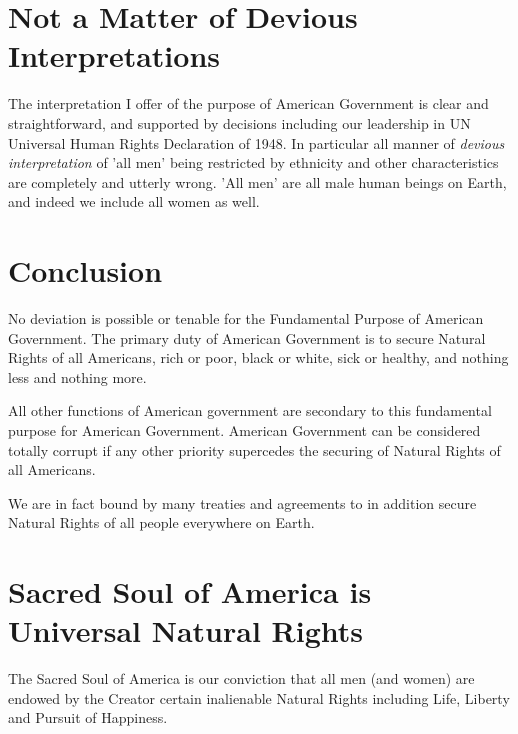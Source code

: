 \documentclass{amsart}
\begin{document}
\section{Not a Matter of Devious Interpretations}

The interpretation I offer of the purpose of American Government is clear and straightforward, and supported by decisions including our leadership in UN Universal Human Rights Declaration of 1948. In particular all manner of {\em devious interpretation} of 'all men' being restricted by ethnicity and other characteristics are completely and utterly wrong.  'All men' are all male human beings on Earth, and indeed we include all women as well.

\section{Conclusion}

No deviation is possible or tenable for the Fundamental Purpose of American Government.  The primary duty of American Government is to secure Natural Rights of all Americans, rich or poor, black or white, sick or healthy, and nothing less and nothing more.

All other functions of American government are secondary to this fundamental purpose for American Government.  American Government can be considered totally corrupt if any other priority supercedes the securing of Natural Rights of all Americans.  

We are in fact bound by many treaties and agreements to in addition secure Natural Rights of all people everywhere on Earth.

\section{Sacred Soul of America is Universal Natural Rights}

The Sacred Soul of America is our conviction that all men (and women) are endowed by the Creator certain inalienable Natural Rights including Life, Liberty and Pursuit of Happiness. 
\end{document}
